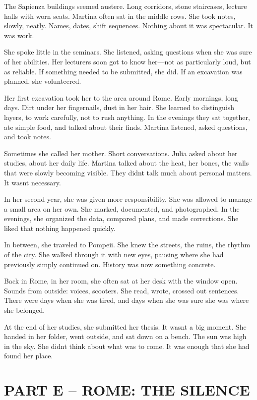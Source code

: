 \documentclass[
]{article}
\begin{document}
The Sapienza buildings seemed austere. Long corridors, stone staircases, lecture halls with worn seats. Martina often sat in the middle rows. She took notes, slowly, neatly. Names, dates, shift sequences. Nothing about it was spectacular. It was work.

She spoke little in the seminars. She listened, asking questions when she was sure of her abilities. Her lecturers soon got to know her---not as particularly loud, but as reliable. If something needed to be submitted, she did. If an excavation was planned, she volunteered.

Her first excavation took her to the area around Rome. Early mornings, long days. Dirt under her fingernails, dust in her hair. She learned to distinguish layers, to work carefully, not to rush anything. In the evenings they sat together, ate simple food, and talked about their finds. Martina listened, asked questions, and took notes.

Sometimes she called her mother. Short conversations. Julia asked about her studies, about her daily life. Martina talked about the heat, her bones, the walls that were slowly becoming visible. They didn\textquotesingle t talk much about personal matters. It wasn\textquotesingle t necessary.

In her second year, she was given more responsibility. She was allowed to manage a small area on her own. She marked, documented, and photographed. In the evenings, she organized the data, compared plans, and made corrections. She liked that nothing happened quickly.

In between, she traveled to Pompeii. She knew the streets, the ruins, the rhythm of the city. She walked through it with new eyes, pausing where she had previously simply continued on. History was now something concrete.

Back in Rome, in her room, she often sat at her desk with the window open. Sounds from outside: voices, scooters. She read, wrote, crossed out sentences. There were days when she was tired, and days when she was sure she was where she belonged.

At the end of her studies, she submitted her thesis. It wasn\textquotesingle t a big moment. She handed in her folder, went outside, and sat down on a bench. The sun was high in the sky. She didn\textquotesingle t think about what was to come. It was enough that she had found her place.

\section{PART E -- ROME: THE SILENCE}\label{part-e-rome-the-silence}
\end{document}
